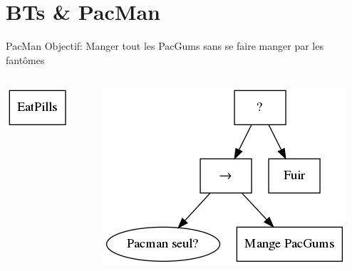 \documentclass[presentation]{beamer}
\begin{document}
\section{BTs \& PacMan}
\label{sec-3}
\begin{frame}[label=sec-3-0-1]{PacMan}
Objectif: Manger tout les PacGums sans se faire manger par les fantômes

\begin{columns}
\begin{column}{0.5\textwidth}

\includegraphics[width=.9\linewidth]{img/EatPills.png}
\end{column}

\begin{column}{0.5\textwidth}

\includegraphics[width=.9\linewidth]{img/EatPills2.png}
\end{column}
\end{columns}
\end{frame}
\end{document}
